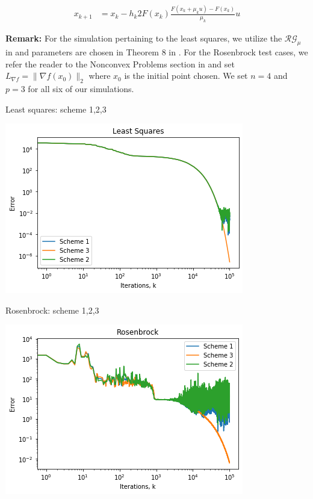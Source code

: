 \documentclass{article}
\begin{document}
\begin{align}
x_{k+1} & = x_k - h_k 2F(x_k)\frac{F(x_k+\mu_k u) - F(x_k)}{\mu_k}u
\end{align}

\textbf{Remark:} For the simulation pertaining to the least squares, we utilize the $\mathcal{R}\mathcal{G}_{\mu}$ in \cite{Nesterov2015} and parameters are chosen in Theorem $8$ in \cite{Nesterov2015}. For the Rosenbrock test cases, we refer the reader to the Nonconvex Problems section in \cite{Nesterov2015} and set $L_{\nabla f} = \| \nabla f(x_0)\|_2$ where $x_0$ is the initial point chosen. We set $n = 4$ and $p = 3$ for all six of our simulations. \newline 

Least squares: scheme 1,2,3 \newline 

\includegraphics{tex_images/zerothorder_composite_LS}

Rosenbrock: scheme 1,2,3 \newline 

\includegraphics{tex_images/zerothorder_composite_Rosenbrock}
\end{document}
